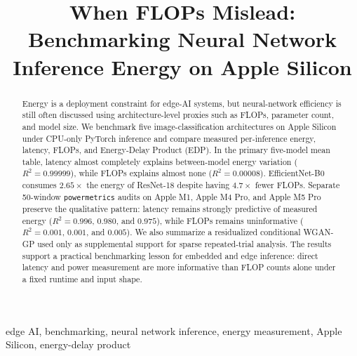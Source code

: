 \documentclass[conference]{IEEEtran}
\begin{document}
\title{When FLOPs Mislead: Benchmarking Neural Network Inference Energy on Apple Silicon}

\author{
\and
{}
}

\maketitle

\begin{abstract}
Energy is a deployment constraint for edge-AI systems, but neural-network
efficiency is still often discussed using architecture-level proxies such as
FLOPs, parameter count, and model size. We benchmark five image-classification
architectures on Apple Silicon under CPU-only PyTorch inference and compare
measured per-inference energy, latency, FLOPs, and Energy-Delay Product (EDP).
In the primary five-model mean table, latency almost completely explains
between-model energy variation ($R^2=0.99999$), while FLOPs explains almost
none ($R^2=0.00008$). EfficientNet-B0 consumes $2.65\times$ the energy of
ResNet-18 despite having $4.7\times$ fewer FLOPs. Separate 50-window
\texttt{powermetrics} audits on Apple M1, Apple M4 Pro, and Apple M5 Pro
preserve the qualitative pattern: latency remains strongly predictive of
measured energy ($R^2=0.996$, $0.980$, and $0.975$), while FLOPs remains
uninformative ($R^2=0.001$, $0.001$, and $0.005$). We also
summarize a residualized conditional WGAN-GP used only as supplemental
support for sparse repeated-trial analysis. The results support a practical
benchmarking lesson for embedded and edge inference: direct latency and power
measurement are more informative than FLOP counts alone under a fixed runtime
and input shape.
\end{abstract}

\begin{IEEEkeywords}
edge AI, benchmarking, neural network inference, energy measurement, Apple
Silicon, energy-delay product
\end{IEEEkeywords}
\end{document}
